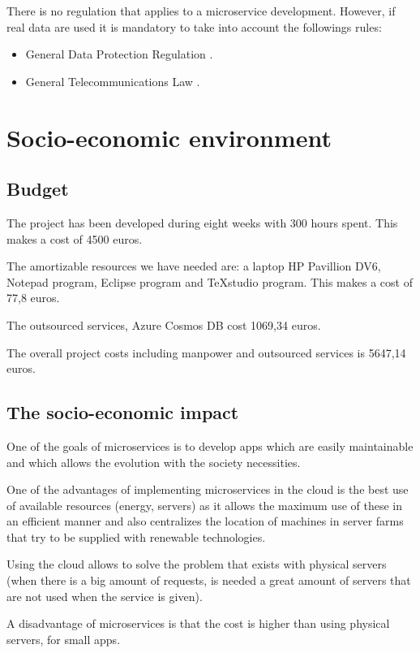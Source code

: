 \documentclass[12pt]{report} %
\begin{document}
There is no regulation that applies to a microservice development. However, if real data are used it is mandatory to take into account the followings rules:
\begin{itemize}
	\item General Data Protection Regulation \cite{gdpr}.
	\item General Telecommunications Law \cite{LeyComunicaciones}.
\end{itemize}


\section{Socio-economic environment}	

\subsection{Budget}

The project has been developed during eight weeks with 300 hours spent. This makes a cost of 4500 euros. 

The amortizable resources we have needed are: a laptop HP Pavillion DV6, Notepad program, Eclipse program and TeXstudio program. This makes a cost of 77,8 euros. 

The outsourced services, Azure Cosmos DB cost 1069,34 euros. 

The overall project costs including manpower and outsourced services is 5647,14 euros.

\subsection{The socio-economic impact}

One of the goals of microservices is to develop apps which are easily maintainable and which allows the evolution with the society necessities.

One of the advantages of implementing microservices in the cloud is the best use of available resources (energy, servers) as it allows the maximum use of these in an efficient manner and also centralizes the location of machines in server farms that try to be supplied with renewable technologies.

Using the cloud allows to solve the problem that exists with physical servers (when there is a big amount of requests, is needed a great amount of servers that are not used when the service is given). 

A disadvantage of microservices is that the cost is higher than using physical servers, for small apps.
\end{document}
